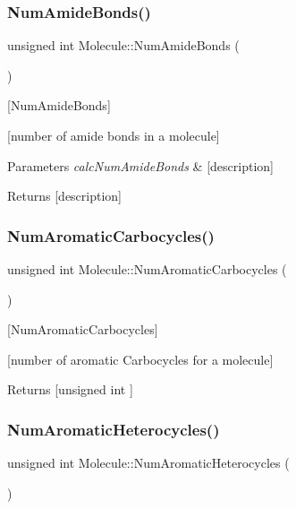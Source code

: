\subsubsection{\texorpdfstring{Num\+Amide\+Bonds()}{NumAmideBonds()}}
{\footnotesize\ttfamily unsigned int Molecule\+::\+Num\+Amide\+Bonds (\begin{DoxyParamCaption}{ }\end{DoxyParamCaption})}



\mbox{[}Num\+Amide\+Bonds\mbox{]} 

\mbox{[}number of amide bonds in a molecule\mbox{]}


\begin{DoxyParams}{Parameters}
{\em calc\+Num\+Amide\+Bonds} & \mbox{[}description\mbox{]} \\
\hline
\end{DoxyParams}
\begin{DoxyReturn}{Returns}
\mbox{[}description\mbox{]} 
\end{DoxyReturn}
\mbox{\label{class_molecule_af0be542ca2e2d7d137d80dc0fdc7d6ec}} 
\subsubsection{\texorpdfstring{Num\+Aromatic\+Carbocycles()}{NumAromaticCarbocycles()}}
{\footnotesize\ttfamily unsigned int Molecule\+::\+Num\+Aromatic\+Carbocycles (\begin{DoxyParamCaption}{ }\end{DoxyParamCaption})}



\mbox{[}Num\+Aromatic\+Carbocycles\mbox{]} 

\mbox{[}number of aromatic Carbocycles for a molecule\mbox{]}

\begin{DoxyReturn}{Returns}
\mbox{[}unsigned int \mbox{]} 
\end{DoxyReturn}
\mbox{\label{class_molecule_acacbd3d2e5fc65157be32f14ef98f15d}} 
\subsubsection{\texorpdfstring{Num\+Aromatic\+Heterocycles()}{NumAromaticHeterocycles()}}
{\footnotesize\ttfamily unsigned int Molecule\+::\+Num\+Aromatic\+Heterocycles (\begin{DoxyParamCaption}{ }\end{DoxyParamCaption})}



